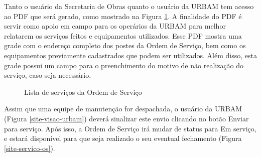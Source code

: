 \documentclass[
	article,			%
	11pt,				%
	oneside,			%
	a4paper,			%
	english,			%
	brazil,				%
	sumario=tradicional
	]{abntex2}
\begin{document}
Tanto o usuário da Secretaria de Obras quanto o usuário da URBAM tem acesso ao PDF que será gerado, como mostrado na Figura \ref{site-pdf}.
A finalidade do PDF é servir como apoio em campo para os operários da URBAM para melhor relatarem os serviços feitos e equipamentos utilizados.
Esse PDF mostra uma grade com o endereço completo dos postes da Ordem de Serviço, bem como os equipamentos previamente cadastrados que podem ser utilizados.
Além disso, esta grade possui um campo para o preenchimento do motivo de não realização do serviço, caso seja necessário.

\begin{figure}[!htbp]
 \centering
 \caption{\label{site-pdf}Lista de serviços da Ordem de Serviço}
\end{figure}

Assim que uma equipe de manutenção for despachada, o usuário da URBAM (Figura \ref{site-visao-urbam}) deverá sinalizar este envio clicando no botão Enviar para serviço.
Após isso, a Ordem de Serviço irá mudar de status para Em serviço, e estará disponível para que seja realizado o seu eventual fechamento (Figura \ref{site-servico-os}).
\end{document}
